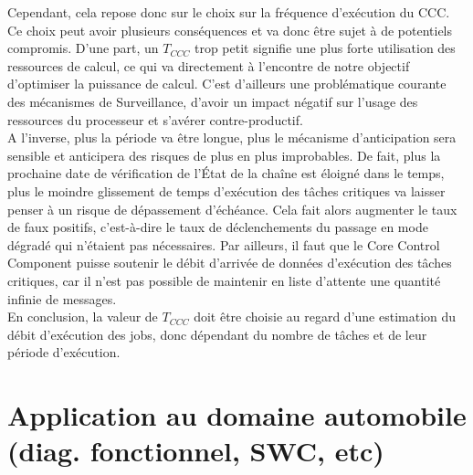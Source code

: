 \documentclass[french, a4paper, 11pt, twoside, pdftex]{StyleThese}
\begin{document}
        Cependant, cela repose donc sur le choix sur la fréquence d'exécution du CCC. Ce choix peut avoir plusieurs conséquences et va donc être sujet à de potentiels compromis. D'une part, un $T_{CCC}$ trop petit signifie une plus forte utilisation des ressources de calcul, ce qui va directement à l'encontre de notre objectif d'optimiser la puissance de calcul. C'est d'ailleurs une problématique courante des mécanismes de Surveillance, d'avoir un impact négatif sur l'usage des ressources du processeur et s'avérer contre-productif. \\
        A l'inverse, plus la période va être longue, plus le mécanisme d'anticipation sera sensible et anticipera des risques de plus en plus improbables. De fait, plus la prochaine date de vérification de l'État de la chaîne est éloigné dans le temps, plus le moindre glissement de temps d'exécution des tâches critiques va laisser penser à un risque de dépassement d'échéance. Cela fait alors augmenter le taux de faux positifs, c'est-à-dire le taux de déclenchements du passage en mode dégradé qui n'étaient pas nécessaires. Par ailleurs, il faut que le Core Control Component puisse soutenir le débit d'arrivée de données d'exécution des tâches critiques, car il n'est pas possible de maintenir en liste d'attente une quantité infinie de messages. \\
        En conclusion, la valeur de $T_{CCC}$ doit être choisie au regard d'une estimation du débit d'exécution des jobs, donc dépendant du nombre de tâches et de leur période d'exécution. 
        

            
\section{Application au domaine  automobile (diag. fonctionnel, SWC, etc)}
\end{document}
